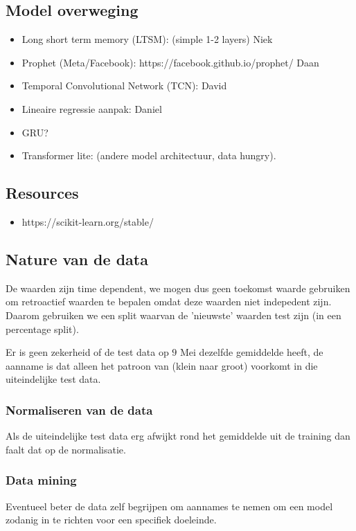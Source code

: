 \documentclass{article}
\begin{document}
\subsection*{Model overweging}

\begin{itemize}
    \item Long short term memory (LTSM): (simple 1-2 layers) Niek
    \item Prophet (Meta/Facebook): https://facebook.github.io/prophet/ Daan
    \item Temporal Convolutional Network (TCN): David
    \item Lineaire regressie aanpak: Daniel
    \item GRU?
    \item Transformer lite: (andere model architectuur, data hungry). 
\end{itemize}

\subsection*{Resources}
\begin{itemize}
    \item https://scikit-learn.org/stable/ 
\end{itemize}

\subsection*{Nature van de data}
De waarden zijn time dependent, we mogen dus geen toekomst waarde gebruiken om retroactief
waarden te bepalen omdat deze waarden niet indepedent zijn. Daarom gebruiken we een split 
waarvan de 'nieuwste' waarden test zijn (in een percentage split).

Er is geen zekerheid of de test data op $9$ Mei dezelfde gemiddelde heeft, de aanname is dat
alleen het patroon van (klein naar groot) voorkomt in die uiteindelijke test data. 

\subsubsection*{Normaliseren van de data}
Als de uiteindelijke test data erg afwijkt rond het gemiddelde uit de training dan faalt dat
op de normalisatie. 

\subsubsection*{Data mining}
Eventueel beter de data zelf begrijpen om aannames te nemen om een model zodanig in te richten voor 
een specifiek doeleinde. 
\end{document}
